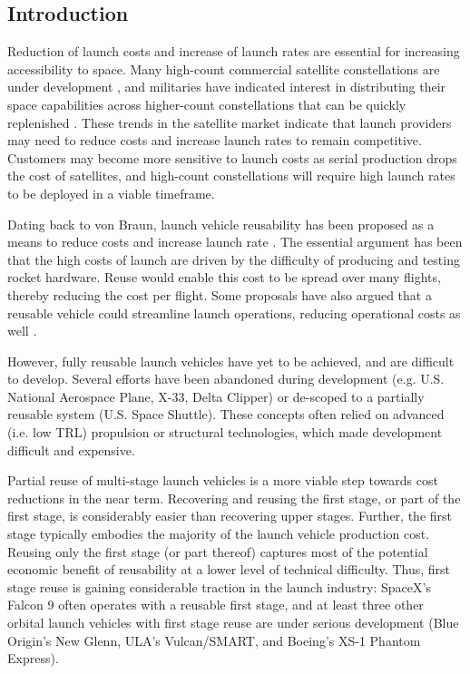 \documentclass[conf]{new-aiaa}
\begin{document}
\begin{multicols}{2}

\section{Introduction}

Reduction of launch costs and increase of launch rates are essential for increasing accessibility to space. Many high-count commercial satellite constellations are under development \cite{SIA2017, Henry2017}, and militaries have indicated interest in distributing their space capabilities across higher-count constellations that can be quickly replenished \cite{DARPA_Blackjack}. These trends in the satellite market indicate that launch providers may need to reduce costs and increase launch rates to remain competitive. Customers may become more sensitive to launch costs as serial production drops the cost of satellites, and high-count constellations will require high launch rates to be deployed in a viable timeframe.

Dating back to von Braun, launch vehicle reusability has been proposed as a means to reduce costs and increase launch rate \cite{vonBraun52}. The essential argument has been that the high costs of launch are driven by the difficulty of producing and testing rocket hardware. Reuse would enable this cost to be spread over many flights, thereby reducing the cost per flight. Some proposals have also argued that a reusable vehicle could streamline launch operations, reducing operational costs as well \cite{Butrica03}.

However, fully reusable launch vehicles have yet to be achieved, and are difficult to develop. Several efforts have been abandoned during development (e.g. U.S. National Aerospace Plane, X-33, Delta Clipper) or de-scoped to a partially reusable system (U.S. Space Shuttle). These concepts often relied on advanced (i.e. low TRL) propulsion or structural technologies, which made development difficult and expensive.

Partial reuse of multi-stage launch vehicles is a more viable step towards cost reductions in the near term. Recovering and reusing the first stage, or part of the first stage, is considerably easier than recovering upper stages. Further, the first stage typically embodies the majority of the launch vehicle production cost. Reusing only the first stage (or part thereof) captures most of the potential economic benefit of reusability at a lower level of technical difficulty. Thus, first stage reuse is gaining considerable traction in the launch industry: SpaceX's Falcon 9 often operates with a reusable first stage, and at least three other orbital launch vehicles with first stage reuse are under serious development (Blue Origin's New Glenn, ULA's Vulcan/SMART, and Boeing's XS-1 Phantom Express).


\end{multicols}
\end{document}
